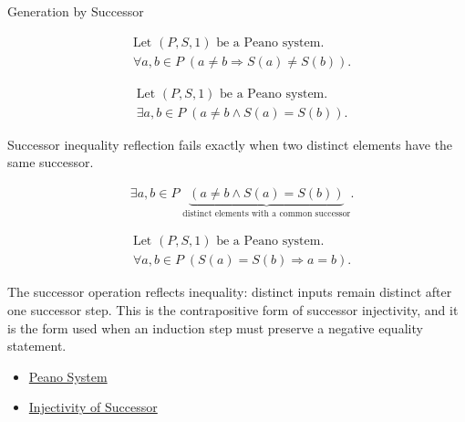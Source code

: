 \begin{topicbox}{Generation by Successor}
\begin{remark*}
\[
\begin{aligned}
&\text{Let } (P,S,1) \text{ be a Peano system.}\\
&\forall a,b \in P\;(a\neq b \Longrightarrow S(a)\neq S(b)).
\end{aligned}
\]
\end{remark*}

\begin{remark*}
\[
\begin{aligned}
&\text{Let } (P,S,1) \text{ be a Peano system.}\\
&\exists a,b \in P\;(a\neq b \land S(a)=S(b)).
\end{aligned}
\]
\end{remark*}

\begin{remark*}
Successor inequality reflection fails exactly when two distinct elements have
the same successor.
\end{remark*}

\begin{remark*}
\[
\begin{aligned}
&\exists a,b \in P\;
\underbrace{(a\neq b \land S(a)=S(b))}_{\text{distinct elements with a common successor}}.
\end{aligned}
\]
\end{remark*}

\begin{remark*}
\[
\begin{aligned}
&\text{Let } (P,S,1) \text{ be a Peano system.}\\
&\forall a,b \in P\;(S(a)=S(b) \Longrightarrow a=b).
\end{aligned}
\]
\end{remark*}

\begin{remark*}[Interpretation]
The successor operation reflects inequality: distinct inputs remain distinct
after one successor step. This is the contrapositive form of successor
injectivity, and it is the form used when an induction step must preserve a
negative equality statement.
\end{remark*}

\begin{dependencies}
\begin{itemize}
  \item \hyperref[def:peano-system]{Peano System}
  \item \hyperref[ax:peano-successor-injective]{Injectivity of Successor}
\end{itemize}
\end{dependencies}


\end{topicbox}
